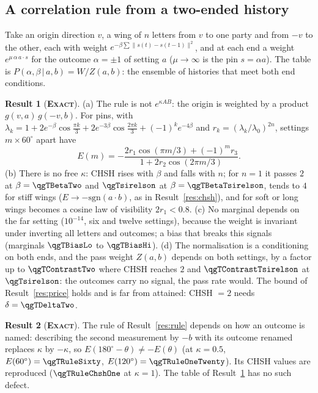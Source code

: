 \documentclass[11pt]{article}
\newcommand{\exact}{\textbf{\textsc{Exact}}}
\theoremstyle{definition}
\newtheorem{result}{Result}
\begin{document}
\subsection{A correlation rule from a two-ended history}\label{sec:staged-rule}
Take an origin direction $v$, a wing of $n$ letters from $v$ to one party and from $-v$ to the other, each with weight $e^{-\beta\sum\|s(t)-s(t-1)\|^2}$, and at each end a weight $e^{\mu\,\alpha\,a\cdot s}$ for the outcome $\alpha=\pm1$ of setting $a$ ($\mu\to\infty$ is the pin $s=\alpha a$). The table is $P(\alpha,\beta\,|\,a,b)=W/Z(a,b)$: the ensemble of histories that meet both end conditions.
\begin{result}[\exact]\label{res:derived}
(a) The rule is not $e^{\kappa AB}$: the origin is weighted by a product $g(v,a)\,g(-v,b)$. For pins, with $\lambda_k=1+2e^{-\beta}\cos\frac{\pi k}{3}+2e^{-3\beta}\cos\frac{2\pi k}{3}+(-1)^ke^{-4\beta}$ and $r_k=(\lambda_k/\lambda_0)^{2n}$, settings $m\times60^\circ$ apart have
\[E(m)=-\frac{2r_1\cos(\pi m/3)+(-1)^mr_3}{1+2r_2\cos(2\pi m/3)} .\]
(b) There is no free $\kappa$: CHSH rises with $\beta$ and falls with $n$; for $n=1$ it passes $2$ at $\beta=\qgTBetaTwo$ and $\qgTsirelson$ at $\beta=\qgTBetaTsirelson$, tends to $4$ for stiff wings ($E\to-\mathrm{sgn}(a\cdot b)$, as in Result~\ref{res:chsh}), and for soft or long wings becomes a cosine law of visibility $2r_1<0.8$. (c) No marginal depends on the far setting ($10^{-14}$, six and twelve settings), because the weight is invariant under inverting all letters and outcomes; a bias that breaks this signals (marginals $\qgTBiasLo$ to $\qgTBiasHi$). (d) The normalisation is a conditioning on both ends, and the pass weight $Z(a,b)$ depends on both settings, by a factor up to $\qgTContrastTwo$ where CHSH reaches $2$ and $\qgTContrastTsirelson$ at $\qgTsirelson$: the outcomes carry no signal, the pass rate would. The bound of Result~\ref{res:price} holds and is far from attained: CHSH $=2$ needs $\delta=\qgTDeltaTwo$.
\end{result}
\begin{result}[\exact]\label{res:rule-label}
The rule of Result~\ref{res:rule} depends on how an outcome is named: describing the second measurement by $-b$ with its outcome renamed replaces $\kappa$ by $-\kappa$, so $E(180^\circ-\theta)\ne-E(\theta)$ (at $\kappa=0.5$, $E(60^\circ)=\qgTRuleSixty$, $E(120^\circ)=\qgTRuleOneTwenty$). Its CHSH values are reproduced ($\qgTRuleChshOne$ at $\kappa=1$). The table of Result~\ref{res:derived} has no such defect.
\end{result}
\end{document}
